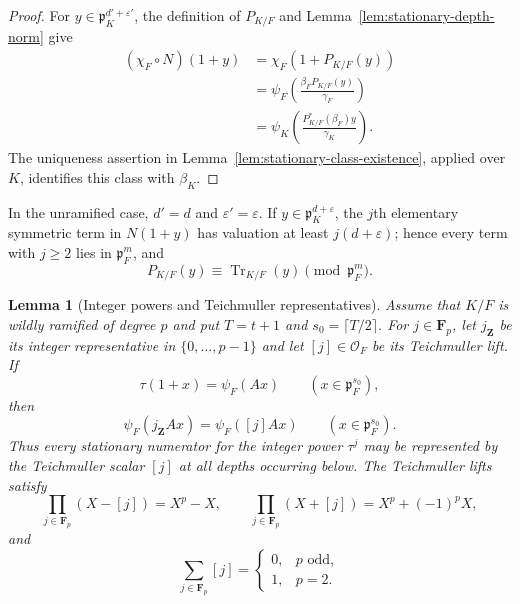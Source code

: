 \documentclass[11pt]{amsart}
\newtheorem{lemma}[theorem]{Lemma}
\theoremstyle{definition}
\theoremstyle{remark}
\newcommand{\F}{\mathbf F}
\newcommand{\cO}{\mathcal O}
\newcommand{\p}{\mathfrak p}
\newcommand{\Tr}{\operatorname{Tr}}
\begin{document}
\begin{proof}
For $y\in\p_K^{d'+\varepsilon'}$, the definition of $P_{K/F}$ and
Lemma~\ref{lem:stationary-depth-norm} give
\begin{align*}
 (\chi_F\circ N)(1+y)
 &=\chi_F(1+P_{K/F}(y))\\
 &=\psi_F\!\left(\frac{\beta_FP_{K/F}(y)}{\gamma_F}\right)\\
 &=\psi_K\!\left(\frac{P^*_{K/F}(\beta_F)y}{\gamma_K}\right).
\end{align*}
The uniqueness assertion in
Lemma~\ref{lem:stationary-class-existence}, applied over $K$, identifies
this class with $\beta_K$.
\end{proof}

In the unramified case, $d'=d$ and
$\varepsilon'=\varepsilon$.  If
$y\in\p_K^{d+\varepsilon}$, the $j$th elementary symmetric term in
$N(1+y)$ has valuation at least $j(d+\varepsilon)$; hence every term
with $j\geq2$ lies in $\p_F^m$, and
\begin{equation}\label{eq:unramified-P-trace}
 P_{K/F}(y)\equiv\Tr_{K/F}(y)\pmod{\p_F^m}.
\end{equation}

\begin{lemma}[Integer powers and Teichmuller representatives]
\label{lem:teichmueller-stationary}
Assume that $K/F$ is wildly ramified of degree $p$ and put
$T=t+1$ and $s_0=\lceil T/2\rceil$.  For $j\in\F_p$, let
$j_{\mathbf Z}$ be its integer representative in
$\{0,\ldots,p-1\}$ and let $[j]\in\cO_F$ be its Teichmuller lift.  If
\[
 \tau(1+x)=\psi_F(Ax)\qquad(x\in\p_F^{s_0}),
\]
then
\begin{equation}\label{eq:teichmueller-stationary}
 \psi_F(j_{\mathbf Z}Ax)=\psi_F([j]Ax)
 \qquad(x\in\p_F^{s_0}).
\end{equation}
Thus every stationary numerator for the integer power $\tau^j$ may be
represented by the Teichmuller scalar $[j]$ at all depths occurring
below.  The Teichmuller lifts satisfy
\begin{equation}\label{eq:teichmueller-polynomials}
 \prod_{j\in\F_p}(X-[j])=X^p-X,
 \qquad
 \prod_{j\in\F_p}(X+[j])=X^p+(-1)^pX,
\end{equation}
and
\begin{equation}\label{eq:teichmueller-sum}
 \sum_{j\in\F_p}[j]=
 \begin{cases}0,&p\text{ odd},\\1,&p=2.\end{cases}
\end{equation}
\end{lemma}
\end{document}
